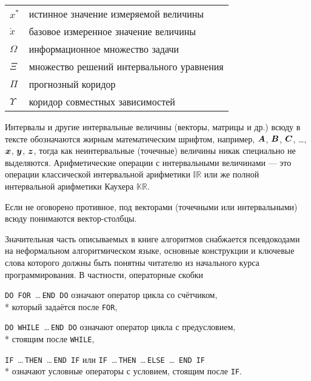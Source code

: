 \documentclass[a5paper,openany]{book}
\newcommand{\mbf}[1]{\protect\text{\boldmath$#1$}}
\newcommand{\mbb}{\mathbb}
\begin{document}
{\begin{longtable}[c]{ll}
$x^\ast$        & истинное значение измеряемой величины            \\[3pt]  
$\mathring{x}$  & базовое измеренное значение величины             \\[3pt]  
$\varOmega$   &   информационное множество задачи                  \\[3pt] 
$\varXi$      &   множество решений интервального уравнения        \\[3pt] 
$\varPi$      &   прогнозный коридор                               \\[3pt] 
$\varUpsilon$ &   коридор совместных зависимостей 
\end{longtable}
}
  
%  
  
Интервалы и другие интервальные величины (векторы, матрицы и др.) всюду
в тексте обозначаются жирным математическим шрифтом, например, $\mbf{A}$,
$\mbf{B}$, $\mbf{C}$, \ldots, $\mbf{x}$, $\mbf{y}$, $\mbf{z}$, тогда как
неинтервальные (точечные) величины никак специально не выделяются.
Арифметические операции с интервальными величинами --- это операции
классической интервальной арифметики $\mbb{IR}$ или же полной интервальной 
арифметики Каухера $\mbb{KR}$. 
  
Если не оговорено противное, под векторами (точечными или интервальными) 
всюду понимаются вектор-столбцы. 
  
Значительная часть описываемых в книге алгоритмов снабжается псевдокодами
на неформальном алгоритмическом языке, основные конструкции и ключевые слова 
которого должны быть понятны читателю из начального курса программирования. 
В частности, операторные скобки
\begin{list}{}{\itemsep 2pt\topsep 7pt\leftmargin 20pt}
\item
\texttt{DO FOR}\, \ldots \,\texttt{END DO}\; означают оператор цикла
со счётчиком,\\*  \phantom{a}\quad  который задаётся после \texttt{FOR},
\item
\texttt{DO WHILE}\, \ldots \,\texttt{END DO}\; означают оператор цикла
с предусловием,\\*  \phantom{a}\quad  стоящим после \texttt{WHILE},
\item
\texttt{IF}\, \ldots \,\texttt{THEN}\, \ldots \,\texttt{END IF}\; или 
\;\texttt{IF}\, \ldots \,\texttt{THEN}\, \ldots \,\texttt{ELSE}\, \ldots 
\,\texttt{END IF}\\*  \phantom{a}\quad  означают  условные операторы 
с условием, стоящим после \texttt{IF}.
\end{list}
  
\end{document}
